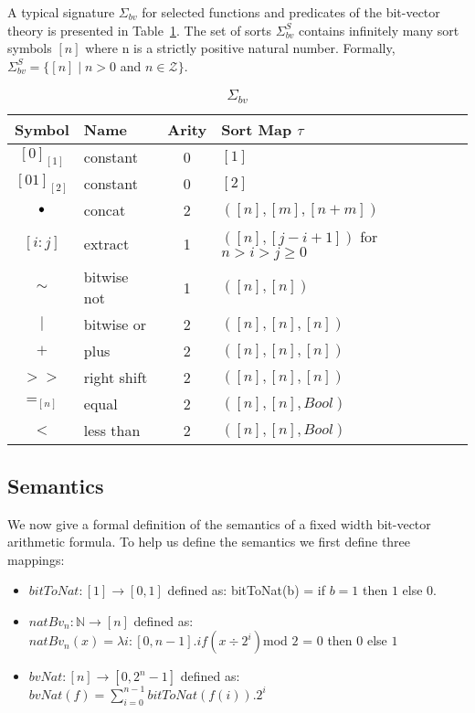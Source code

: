 A typical signature $\Sigma_{bv}$ for selected functions and predicates of the bit-vector theory is presented in Table~\ref{tbl:signature}. The set of sorts $\Sigma_{bv}^S$ contains
infinitely many sort symbols $[n]$ where n is a strictly positive natural number. Formally, $\Sigma_{bv}^S = \{[n] \mid n > 0 $ and $ n \in \mathcal{Z}\}$.
\begin{table}[t]
\centering
\caption{$\Sigma_{bv}$}
\label{tbl:signature}
\begin{tabular}{c | l | c | l }
Symbol & Name & Arity & Sort Map $\tau$  \\
\hline \hline
$[0]_{[1]}$ & constant & 0 & $[1]$  \\
$[01]_{[2]}$ & constant & 0 & $[2]$  \\ 
$\mathop{\bullet}$ & concat & 2 & $([n],[m],[n+m])$ \\
$[i:j]$ & extract & 1 & $([n],[j-i+1])$ for $n > i > j \ge 0$
 \\ 
$\sim$ & bitwise not & 1 & $([n],[n])$  \\
$\mid$ & bitwise or & 2 & $([n],[n],[n])$ \\
$+$ & plus & 2 & $([n],[n],[n])$ \\
$>>$ & right shift & 2 & $([n],[n],[n])$\\
$=_{[n]}$ & equal & 2 & $([n],[n],Bool)$  \\
$<$ & less than & 2 & $([n],[n],Bool)$ \\

\end{tabular}
\end{table}

\subsection{Semantics}

We now give a formal definition of the semantics of a fixed width bit-vector arithmetic formula. To help us define the semantics we first define three mappings:
\begin{itemize}
\item $bitToNat:[1] \rightarrow [0,1]$ defined as:
bitToNat(b) = if $b = 1$ then $1$ else $0$.
\item $natBv_n : \mathbb{N} \rightarrow [n]$ defined as: \\
$natBv_n(x) = \lambda i : [0, n-1].if (x \div 2^i ) $mod $2$ = $0$ then $0$ else $1$
\item $bvNat : [n]\rightarrow[0, 2^n-1]$ defined as: 
$bvNat(f) = \sum^{n-1}_{i=0} bitToNat(f(i)).2^i$
\end{itemize}

